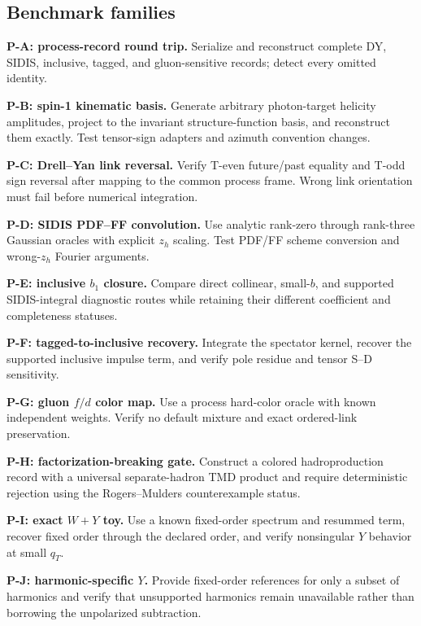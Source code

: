 \documentclass[11pt]{article}
\begin{document}
\subsection{Benchmark families}

\textbf{P-A: process-record round trip.}
Serialize and reconstruct complete DY, SIDIS, inclusive, tagged, and gluon-sensitive records; detect every omitted identity.

\textbf{P-B: spin-1 kinematic basis.}
Generate arbitrary photon-target helicity amplitudes, project to the invariant structure-function basis, and reconstruct them exactly.  Test tensor-sign adapters and azimuth convention changes.

\textbf{P-C: Drell--Yan link reversal.}
Verify T-even future/past equality and T-odd sign reversal after mapping to the common process frame.  Wrong link orientation must fail before numerical integration.

\textbf{P-D: SIDIS PDF--FF convolution.}
Use analytic rank-zero through rank-three Gaussian oracles with explicit \(z_h\) scaling.  Test PDF/FF scheme conversion and wrong-\(z_h\) Fourier arguments.

\textbf{P-E: inclusive \(b_1\) closure.}
Compare direct collinear, small-\(b\), and supported SIDIS-integral diagnostic routes while retaining their different coefficient and completeness statuses.

\textbf{P-F: tagged-to-inclusive recovery.}
Integrate the spectator kernel, recover the supported inclusive impulse term, and verify pole residue and tensor S--D sensitivity.

\textbf{P-G: gluon \(f/d\) color map.}
Use a process hard-color oracle with known independent weights.  Verify no default mixture and exact ordered-link preservation.

\textbf{P-H: factorization-breaking gate.}
Construct a colored hadroproduction record with a universal separate-hadron TMD product and require deterministic rejection using the Rogers--Mulders counterexample status.

\textbf{P-I: exact \(W+Y\) toy.}
Use a known fixed-order spectrum and resummed term, recover fixed order through the declared order, and verify nonsingular \(Y\) behavior at small \(q_T\).

\textbf{P-J: harmonic-specific \(Y\).}
Provide fixed-order references for only a subset of harmonics and verify that unsupported harmonics remain unavailable rather than borrowing the unpolarized subtraction.
\end{document}

